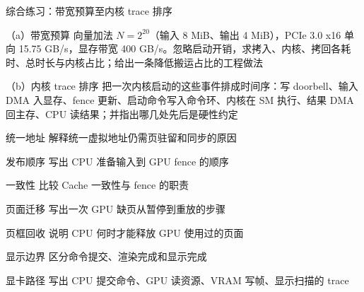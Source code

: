 \begin{chapterexercise}{综合练习：带宽预算至内核 trace 排序}
\begin{exercisesubproblem}{（a）带宽预算}
向量加法 $N=2^{20}$（输入 8 MiB、输出 4 MiB），PCIe 3.0 x16 单向 15.75 GB/s，显存带宽 400 GB/s。忽略启动开销，求拷入、内核、拷回各耗时、总时长与内核占比；给出一条降低搬运占比的工程做法
\end{exercisesubproblem}
\begin{exercisesubproblem}{（b）内核 trace 排序}
把一次内核启动的这些事件排成时间序：写 doorbell、输入 DMA 入显存、fence 更新、启动命令写入命令环、内核在 SM 执行、结果 DMA 回主存、CPU 读结果；并指出哪几处先后是硬性约定
\end{exercisesubproblem}
\end{chapterexercise}

\begin{chapterexercise}{统一地址}
解释统一虚拟地址仍需页驻留和同步的原因
\end{chapterexercise}

\begin{chapterexercise}{发布顺序}
写出 CPU 准备输入到 GPU fence 的顺序
\end{chapterexercise}

\begin{chapterexercise}{一致性}
比较 Cache 一致性与 fence 的职责
\end{chapterexercise}

\begin{chapterexercise}{页面迁移}
写出一次 GPU 缺页从暂停到重放的步骤
\end{chapterexercise}

\begin{chapterexercise}{页框回收}
说明 CPU 何时才能释放 GPU 使用过的页面
\end{chapterexercise}

\begin{chapterexercise}{显示边界}
区分命令提交、渲染完成和显示完成
\end{chapterexercise}

\begin{chapterexercise}{显卡路径}
写出 CPU 提交命令、GPU 读资源、VRAM 写帧、显示扫描的 trace
\end{chapterexercise}

